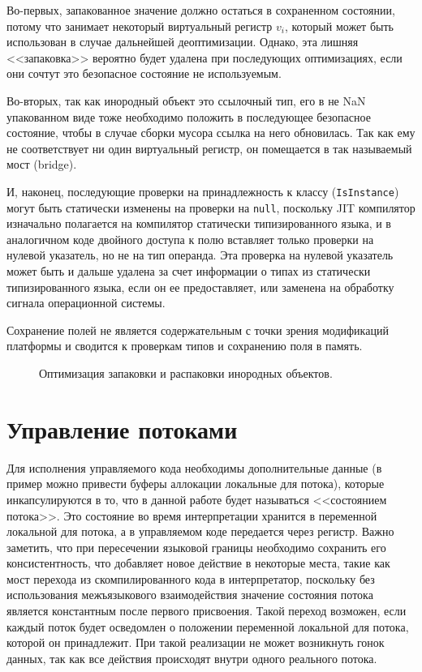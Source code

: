 \documentclass[times
]{itmo-student-thesis}
\begin{document}
Во-первых, запакованное значение должно остаться в сохраненном состоянии, потому что занимает некоторый виртуальный регистр $v_i$, который может быть использован в случае дальнейшей деоптимизации. Однако, эта лишняя <<запаковка>> вероятно будет удалена при последующих оптимизациях, если они сочтут это безопасное состояние не используемым.

Во-вторых, так как инородный объект это ссылочный тип, его в не NaN упакованном виде тоже необходимо положить в последующее безопасное состояние, чтобы в случае сборки мусора ссылка на него обновилась. Так как ему не соответствует ни один виртуальный регистр, он помещается в так называемый мост (bridge).

И, наконец, последующие проверки на принадлежность к классу (\texttt{IsInstance}) могут быть статически изменены на проверки на \texttt{null}, поскольку JIT компилятор изначально полагается на компилятор статически типизированного языка, и в аналогичном коде двойного доступа к полю вставляет только проверки на нулевой указатель, но не на тип операнда. Эта проверка на нулевой указатель может быть и дальше удалена за счет информации о типах из статически типизированного языка, если он ее предоставляет, или заменена на обработку сигнала операционной системы.

Сохранение полей не является содержательным с точки зрения модификаций платформы и сводится к проверкам типов и сохранению поля в память.

\begin{figure}[!h]
	\caption{Оптимизация запаковки и распаковки инородных объектов.}\label{fig:field-opt}
	\centering
	\end{figure}

\section{Управление потоками} \label{sec:thread-management}
Для исполнения управляемого кода необходимы дополнительные данные (в пример можно привести буферы аллокации локальные для потока), которые инкапсулируются в то, что в данной работе будет называться <<состоянием потока>>. Это состояние во время интерпретации хранится в переменной локальной для потока, а в управляемом коде передается через регистр. Важно заметить, что при пересечении языковой границы необходимо сохранить его консистентность, что добавляет новое действие в некоторые места, такие как мост перехода из скомпилированного кода в интерпретатор, поскольку без использования межъязыкового взаимодействия значение состояния потока является константным после первого присвоения. Такой переход возможен, если каждый поток будет осведомлен о положении переменной локальной для потока, которой он принадлежит. При такой реализации не может возникнуть гонок данных, так как все действия происходят внутри одного реального потока.
\end{document}
